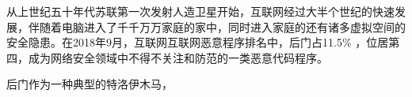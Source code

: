 从上世纪五十年代苏联第一次发射人造卫星开始，互联网经过大半个世纪的快速发展，伴随着电脑进入了千千万万家庭的家中，同时进入家庭的还有诸多虚拟空间的安全隐患。在2018年9月，互联网互联网恶意程序排名中，后门占11.5\% \cite{cert1809}，位居第四，成为网络安全领域中不得不关注和防范的一类恶意代码程序。

后门作为一种典型的特洛伊木马，



	
	
	



